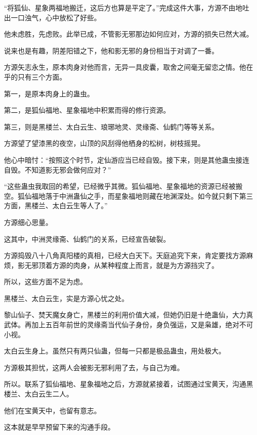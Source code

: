
\begin{this_body}

“将狐仙、星象两福地搬迁，这后方也算是平定了。”完成这件大事，方源不由地吐出一口浊气，心中放松了好些。

他未虑胜，先虑败。此举已成，不管影无邪那边如何应对，方源的损失已然大减。

说来也是有趣，阴差阳错之下，他和影无邪的身份相当于对调了一番。

方源矢志永生，原本肉身对他而言，无异一具皮囊，取舍之间毫无留恋之情。他在乎的只有三个方面。

第一，是原本肉身上的蛊虫。

第二，是狐仙福地、星象福地中积累而得的修行资源。

第三，则是黑楼兰、太白云生、琅琊地灵、灵缘斋、仙鹤门等等关系。

方源望了望漆黑的夜空，山顶的风刮得他栖身的松树，树枝摇晃。

他心中暗忖：“按照这个时节，定仙游应当已经自毁。接下来，则是其他蛊虫接连自毁。不知道影无邪会做何应对？”

“这些蛊虫我取回的希望，已经微乎其微。狐仙福地、星象福地的资源已经被搬空。狐仙福地落于中洲蛊仙之手，而星象福地则藏在地渊深处。如今就只剩下第三方面，黑楼兰、太白云生等人了。”

方源细心思量。

这其中，中洲灵缘斋、仙鹤门的关系，已经宣告破裂。

方源捣毁八十八角真阳楼的真相，已经大白天下。天庭追究下来，肯定要找方源麻烦，影无邪顶着方源的肉身，从某种程度上而言，就是为方源挡灾了。

所以，这些方面不足为虑。

黑楼兰、太白云生，实是方源心忧之处。

黎山仙子、焚天魔女身亡，黑楼兰的利用价值大减，但她仍旧是十绝蛊仙，大力真武体。再加上五百年前世的灵缘斋当代仙子身份，身负强运，又是枭雄，绝对不可小视。

太白云生身上。虽然只有两只仙蛊，但每一只都是极品蛊虫，用处极大。

方源极其担忧，这两人会被影无邪利用了去，与自己为难。

所以。联系了狐仙福地、星象福地之后，方源就紧接着，试图通过宝黄天，沟通黑楼兰、太白云生二人。

他们在宝黄天中，也留有意志。

这本就是早早预留下来的沟通手段。


\end{this_body}

